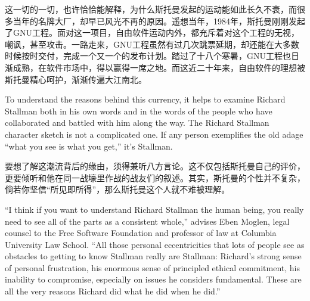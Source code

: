 \ifdefined\chs
这一切的一切，也许恰恰能解释，为什么斯托曼发起的运动能如此长久不衰，而很多当年的名牌大厂，却早已风光不再的原因。遥想当年，1984年，斯托曼刚刚发起了GNU工程。面对这一项目，自由软件运动内外，都充斥着对这个工程的无视，嘲讽，甚至攻击。一路走来，GNU工程虽然有过几次跳票延期，却还能在大多数时候按时交付，完成一个又一个的发布计划。踏过了十八个寒暑，GNU工程也日渐成熟，在软件市场中，得以赢得一席之地。而这近二十年来，自由软件的理想被斯托曼精心呵护，渐渐传遍大江南北。
\fi

\ifdefined\eng
To understand the reasons behind this currency, it helps to examine Richard Stallman both in his own words and in the words of the people who have collaborated and battled with him along the way. The Richard Stallman character sketch is not a complicated one. If any person exemplifies the old adage ``what you see is what you get,'' it's Stallman.
\fi

\ifdefined\chs
要想了解这潮流背后的缘由，须得兼听八方言论。这不仅包括斯托曼自己的评价，更要倾听和他在同一战壕里作战的战友们的叙述。其实，斯托曼的个性并不复杂，倘若你坚信``所见即所得''，那么斯托曼这个人就不难被理解。
\fi

\ifdefined\eng
``I think if you want to understand Richard Stallman the human being, you really need to see all of the parts as a consistent whole,'' advises Eben Moglen, legal counsel to the Free Software Foundation and professor of law at Columbia University Law School. ``All those personal eccentricities that lots of people see as obstacles to getting to know Stallman really are Stallman: Richard's strong sense of personal frustration, his enormous sense of principled ethical commitment, his inability to compromise, especially on issues he considers fundamental. These are all the very reasons Richard did what he did when he did.''
\fi

